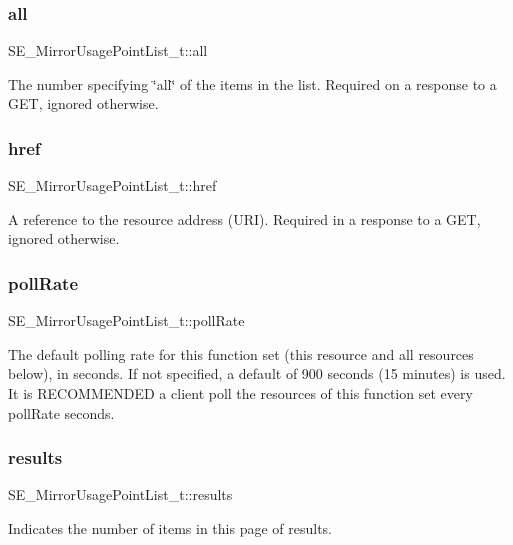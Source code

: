 \subsubsection{\texorpdfstring{all}{all}}
{\footnotesize\ttfamily S\+E\+\_\+\+Mirror\+Usage\+Point\+List\+\_\+t\+::all}

The number specifying \char`\"{}all\char`\"{} of the items in the list. Required on a response to a G\+ET, ignored otherwise. \mbox{\label{group__MirrorUsagePointList_ga575db02c1e3401b72229b00646a12fba}} 
\subsubsection{\texorpdfstring{href}{href}}
{\footnotesize\ttfamily S\+E\+\_\+\+Mirror\+Usage\+Point\+List\+\_\+t\+::href}

A reference to the resource address (U\+RI). Required in a response to a G\+ET, ignored otherwise. \mbox{\label{group__MirrorUsagePointList_ga7b84695ca0e779b95c2b489d3d8257e3}} 
\subsubsection{\texorpdfstring{poll\+Rate}{pollRate}}
{\footnotesize\ttfamily S\+E\+\_\+\+Mirror\+Usage\+Point\+List\+\_\+t\+::poll\+Rate}

The default polling rate for this function set (this resource and all resources below), in seconds. If not specified, a default of 900 seconds (15 minutes) is used. It is R\+E\+C\+O\+M\+M\+E\+N\+D\+ED a client poll the resources of this function set every poll\+Rate seconds. \mbox{\label{group__MirrorUsagePointList_ga56c6a07daa7b9e0e2a30b9259bdc8f29}} 
\subsubsection{\texorpdfstring{results}{results}}
{\footnotesize\ttfamily S\+E\+\_\+\+Mirror\+Usage\+Point\+List\+\_\+t\+::results}

Indicates the number of items in this page of results. 